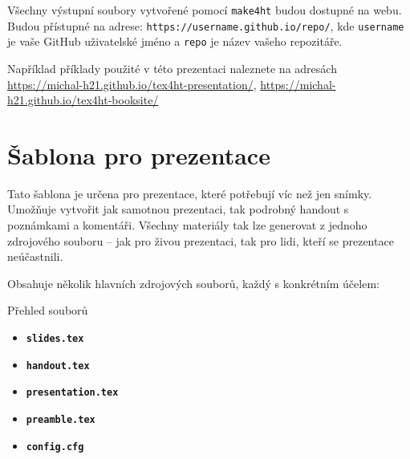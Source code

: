 Všechny výstupní soubory vytvořené pomocí \texttt{make4ht} budou dostupné na webu.
Budou přístupné na adrese:
\verb|https://username.github.io/repo/|,
kde \texttt{username} je vaše GitHub uživatelské jméno a \texttt{repo} je název vašeho repozitáře.

Například příklady použité v této prezentaci naleznete na adresách \url{https://michal-h21.github.io/tex4ht-presentation/},
\url{https://michal-h21.github.io/tex4ht-booksite/}

\section{Šablona pro prezentace}

Tato šablona je určena pro prezentace, které potřebují víc než jen snímky. Umožňuje vytvořit jak samotnou prezentaci, tak podrobný handout s poznámkami a komentáři. Všechny materiály tak lze generovat z jednoho zdrojového souboru – jak pro živou prezentaci, tak pro lidi, kteří se prezentace neúčastnili.

Obsahuje několik hlavních zdrojových souborů, každý s konkrétním účelem:

\begin{frame}[fragile]{Přehled souborů}
\begin{itemize}
\item \textbf{\texttt{slides.tex}}
\item \textbf{\texttt{handout.tex}}
\item \textbf{\texttt{presentation.tex}}
\item \textbf{\texttt{preamble.tex}}
\item \textbf{\texttt{config.cfg}}
\end{itemize}
\end{frame}

